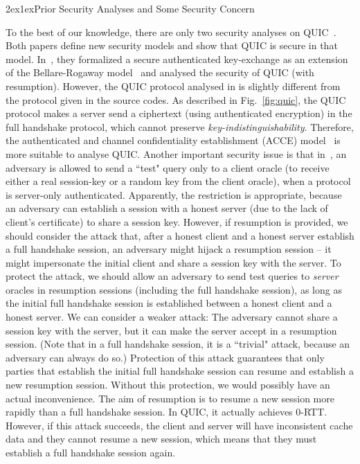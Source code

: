 \documentclass[11pt,a4j]{jarticle}
\makeatletter
\renewcommand{\section}{\@startsection{section}{1}{\z@}%
{2ex}{1ex}{\reset@font\large\bfseries}}%
\makeatother
\begin{document}
\section{Prior Security Analyses and Some Security Concern}

To the best of our knowledge, there are only two security analyses on QUIC~\cite{FG14:QUIC,LJBN15:QUIC}.
Both papers define new security models and show that QUIC is secure in that model.
In~\cite{FG14:QUIC}, they formalized a secure authenticated key-exchange
as an extension of the Bellare-Rogaway model~\cite{BR93:AKE} and analysed
the security of QUIC (with resumption).
However, the QUIC protocol analysed in \cite{FG14:QUIC} is slightly different from the protocol
given in the source codes.
As described in Fig.~\ref{fig:quic}, the QUIC protocol makes a server send a ciphertext (using authenticated encryption) in the full handshake protocol,
which cannot preserve \textit{key-indistinguishability}.
Therefore, the authenticated and channel confidentiality establishment (ACCE)
model~\cite{JKSS12:ACCE} is more suitable to analyse QUIC.
Another important security issue is that in~\cite{FG14:QUIC},
an adversary is allowed to send a ``test" query only to a client oracle (to receive either a real session-key
or  a random key from the client oracle),  when a protocol is server-only authenticated.
Apparently, the restriction is appropriate, because  an adversary can establish a session with
a honest server (due to the lack of client's certificate) to share a session key.
However, if resumption is provided, we should consider the attack that,
after a honest client and a honest server establish a full handshake session,
an adversary might hijack a resumption session -- it might impersonate the initial client and
share a session key with the server.
To protect the attack, we should allow an adversary to send test queries to \textit{server}  oracles
in resumption sessions (including the full handshake session),
as long as the initial full handshake session is established between a honest client and a honest server.
We can consider a weaker attack:
The adversary cannot share a session key with the server, but it can make the server accept in
a resumption session. (Note that in a full handshake session,
it is a ``trivial" attack, because an adversary can always do so.)
Protection of this attack guarantees that only parties that establish the initial full handshake session can
resume and establish a new resumption session.
Without this protection, we would possibly have an actual inconvenience.
The aim of resumption is to resume a new session more rapidly than a full handshake session.
In QUIC, it actually achieves $0$-RTT.
However, if this attack succeeds, the client and server will have inconsistent cache data
and they cannot resume a new session, which means that they must establish a full handshake session again.
\end{document}
